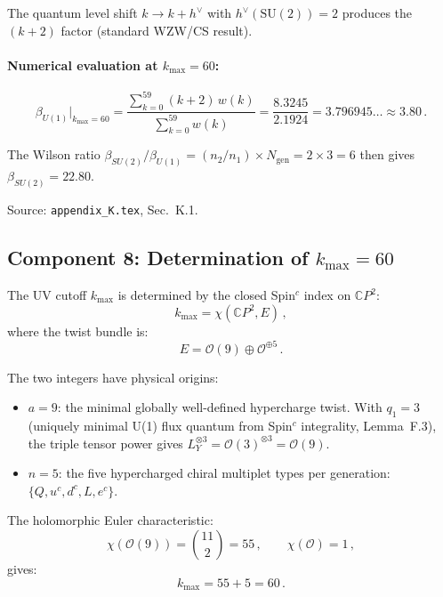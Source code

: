 \documentclass[12pt,a4paper]{article}
\begin{document}
The quantum level shift $k \to k + h^\vee$ with $h^\vee(\mathrm{SU}(2)) = 2$
produces the $(k+2)$ factor (standard WZW/CS result).

\paragraph{Numerical evaluation at $k_{\max} = 60$:}
\begin{equation}
\beta_{U(1)}\big|_{k_{\max}=60}
= \frac{\sum_{k=0}^{59}(k+2)\,w(k)}{\sum_{k=0}^{59}w(k)}
= \frac{8.3245}{2.1924} = 3.796945\ldots \approx 3.80\,.
\end{equation}

The Wilson ratio $\beta_{SU(2)}/\beta_{U(1)} = (n_2/n_1) \times
N_{\mathrm{gen}} = 2 \times 3 = 6$ then gives
$\beta_{SU(2)} = 22.80$.

Source: \texttt{appendix\_K.tex}, Sec.~K.1.

\subsection{Component 8: Determination of $k_{\max} = 60$}

The UV cutoff $k_{\max}$ is determined by the closed Spin$^c$ index
on $\mathbb{C}P^2$:
\begin{equation}
k_{\max} = \chi(\mathbb{C}P^2, E)\,,
\end{equation}
where the twist bundle is:
\begin{equation}
E = \mathcal{O}(9) \oplus \mathcal{O}^{\oplus 5}\,.
\end{equation}

The two integers have physical origins:
\begin{itemize}
\item $a = 9$: the minimal globally well-defined hypercharge twist.
  With $q_1 = 3$ (uniquely minimal U(1) flux quantum from Spin$^c$
  integrality, Lemma~F.3), the triple tensor power gives
  $L_Y^{\otimes 3} = \mathcal{O}(3)^{\otimes 3} = \mathcal{O}(9)$.

\item $n = 5$: the five hypercharged chiral multiplet types per
  generation: $\{Q, u^c, d^c, L, e^c\}$.
\end{itemize}

The holomorphic Euler characteristic:
\begin{equation}
\chi(\mathcal{O}(9)) = \binom{11}{2} = 55\,,\qquad
\chi(\mathcal{O}) = 1\,,
\end{equation}
gives:
\begin{equation}
\boxed{k_{\max} = 55 + 5 = 60\,.}
\end{equation}
\end{document}

